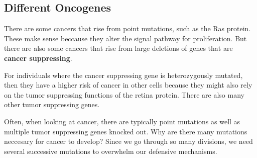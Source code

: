 \documentclass{article}
\begin{document}
\subsection{Different Oncogenes}

There are some cancers that rise from point mutations, such as the Ras protein.
These make sense beccause they alter the signal pathway for proliferation. But
there are also some cancers that rise from large deletions of genes that are
\textbf{cancer suppressing}.

For individuals where the cancer suppressing gene is heterozygously mutated,
then they have a higher risk of cancer in other cells because they might also
rely on the tumor suppressing functions of the retina protein. There are also
many other tumor suppressing genes.

Often, when looking at cancer, there are typically point mutations as well as
multiple tumor suppressing genes knocked out. Why are there many mutations
neccesary for cancer to develop? Since we go through so many divisions, we need
several successive mutations to overwhelm our defensive mechanisms.
\end{document}
